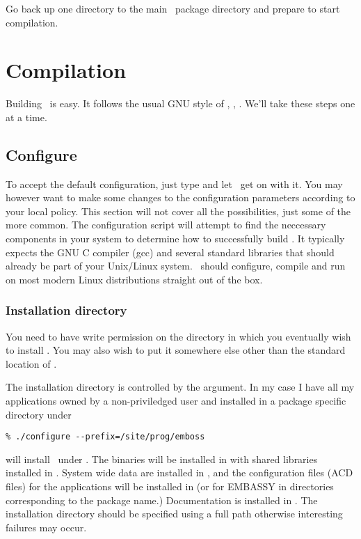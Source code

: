 \documentclass{report}
\begin{document}
Go back up one directory to the main \EMBOSS\ package directory and prepare to start compilation.

\section{Compilation}

Building \EMBOSS\ is easy. It follows the usual GNU style of , , . We'll take these steps one at a time.

\subsection{Configure}

To accept the default configuration, just type  and let \EMBOSS\ get on with it. You may however want to make some changes to the configuration parameters according to your local policy. This section will not cover all the possibilities, just some of the more common. The configuration script will attempt to find the neccessary components in your system to determine how to successfully build \EMBOSS. It typically expects the GNU C compiler (gcc) and several standard libraries that should already be part of your Unix/Linux system. \EMBOSS\ should configure, compile and run on most modern Linux distributions straight out of the box.


\subsubsection{Installation directory}

You need to have write permission on the directory in which you eventually wish to install \EMBOSS. You may also wish to put it somewhere else other than the standard location of .

The installation directory is controlled by the  argument. In my case I have all my applications owned by a non-priviledged user and installed in a package specific directory under 
\begin{verbatim}
% ./configure --prefix=/site/prog/emboss
\end{verbatim}
will install \EMBOSS\ under . The binaries will be installed in  with shared libraries installed in . System wide data are installed in , and the configuration files (ACD files) for the applications will be installed in  (or for EMBASSY in directories corresponding to the package name.) Documentation is installed in  . 
The installation directory should be specified using a full path otherwise interesting failures may occur.
\end{document}
